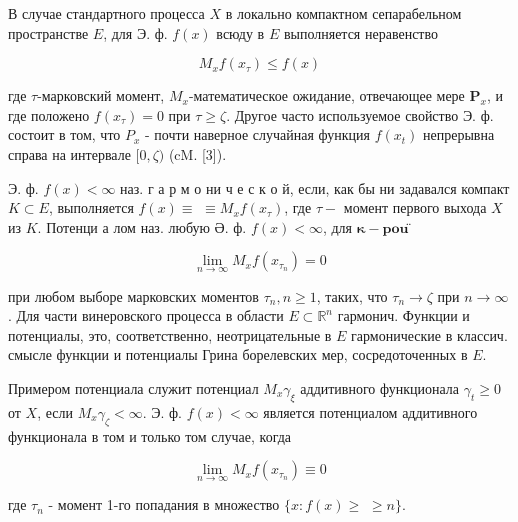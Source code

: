 \documentclass[10pt]{article}
\begin{document}
В случае стандартного процесса $X$ в локально компактном сепарабельном пространстве $E$, для Э. ф. $f(x)$ всюду в $E$ выполняется неравенство



\[

M_{x} f\left(x_{\tau}\right) \leqslant f(x)

\]



где $\tau$-марковский момент, $M_{x}$-математическое ожидание, отвечающее мере $\boldsymbol{P}_{x}$, и где положено $f\left(x_{\tau}\right)=0$ при $\tau \geqslant \zeta$. Другое часто используемое свойство Э. ф. состоит в том, что $P_{x}$ - почти наверное случайная функция $f\left(x_{t}\right)$ непрерывна справа на интервале $[0, \zeta)$ (cM. [3]).



Э. ф. $f(x)<\infty$ наз. г а р м о ни ч е с к о й, если, как бы ни задавался компакт $K \subset E$, выполняется $f(x) \equiv$ $\equiv M_{x} f\left(x_{\tau}\right)$, где $\tau-$ момент первого выхода $X$ из $K$. Потенци а лом наз. любую Ә. ф. $f(x)<\infty$, для $\mathbf{\kappa}-\mathbf{p o u ̈}$



\[

\lim _{n \rightarrow \infty} M_{x} f\left(x_{\tau_{n}}\right)=0

\]



при любом выборе марковских моментов $\tau_{n}, n \geqslant 1$, таких, что $\tau_{n} \rightarrow \zeta$ при $n \rightarrow \infty$. Для части винеровского процесса в области $E \subset \mathbb{R}^{n}$ гармонич. Функции и потенциалы, это, соответственно, неотрицательные в $E$ гармонические в классич. смысле функции и потенциалы Грина борелевских мер, сосредоточенных в $E$.



Примером потенциала служит потенциал $M_{x} \gamma_{\xi}$ аддитивного функционала $\gamma_{t} \geqslant 0$ от $X$, если $M_{x} \gamma_{\zeta}<\infty$. Э. ф. $f(x)<\infty$ является потенциалом аддитивного функционала в том и только том случае, когда



\[

\lim _{n \rightarrow \infty} M_{x} f\left(x_{\tau_{n}}\right) \equiv 0

\]



где $\tau_{n}$ - момент 1-го попадания в множество $\{x: f(x) \geqslant$ $\geqslant n\}$.
\end{document}
